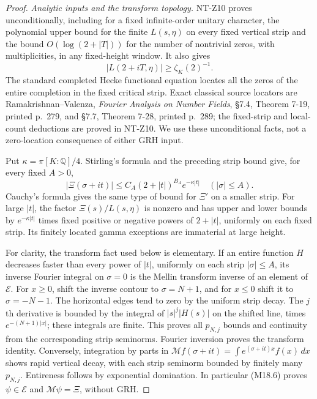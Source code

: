 \begin{proof}
\emph{Analytic inputs and the transform topology.}
NT-Z10 proves unconditionally, including for a fixed
infinite-order unitary character, the polynomial upper bound
for the finite \(L(s,\eta)\) on every fixed vertical strip and
the bound \(O(\log(2+|T|))\) for the number of nontrivial
zeros, with multiplicities, in any fixed-height window.
It also gives
\[
                   |L(2+iT,\eta)|\ge\zeta_K(2)^{-1}.              \tag{M18.5}
\]
The standard completed Hecke functional equation locates all
the zeros of the entire completion in the fixed critical strip.
Exact classical source locators are Ramakrishnan--Valenza,
\emph{Fourier Analysis on Number Fields}, \S7.4,
Theorem 7-19, printed p.~279, and \S7.7, Theorem 7-28,
printed p.~289; the fixed-strip and local-count deductions
are proved in NT-Z10.  We use these unconditional facts,
not a zero-location consequence of either GRH input.

Put \(\kappa=\pi[K:\mathbb Q]/4\).  Stirling's formula and
the preceding strip bound give, for every fixed \(A>0\),
\[
 |\Xi(\sigma+it)|\le C_A(2+|t|)^{B_A}e^{-\kappa|t|}
                         \quad(|\sigma|\le A).                  \tag{M18.6}
\]
Cauchy's formula gives the same type of bound for \(\Xi'\)
on a smaller strip.  For large \(|t|\), the factor
\(\Xi(s)/L(s,\eta)\) is nonzero and has upper and lower
bounds by \(e^{-\kappa|t|}\) times fixed positive or negative
powers of \(2+|t|\), uniformly on each fixed strip.  Its
finitely located gamma exceptions are immaterial at large
height.

For clarity, the transform fact used below is elementary.
If an entire function \(H\) decreases faster than every
power of \(|t|\), uniformly on each strip \(|\sigma|\le A\),
its inverse Fourier integral on \(\sigma=0\) is the Mellin
transform inverse of an element of \(\mathcal E\).
For \(x\ge0\), shift the inverse contour to
\(\sigma=N+1\), and for \(x\le0\) shift it to
\(\sigma=-N-1\).  The horizontal edges tend to zero by the
uniform strip decay.  The \(j\)th derivative is bounded
by the integral of \(|s|^j|H(s)|\) on the shifted line,
times \(e^{-(N+1)|x|}\); these integrals are finite.
This proves all \(p_{N,j}\) bounds and continuity from the
corresponding strip seminorms.  Fourier inversion proves
the transform identity.  Conversely, integration by parts
in \(\mathcal Mf(\sigma+it)=\int e^{(\sigma+it)x}f(x)\,dx\)
shows rapid vertical decay, with each strip seminorm
bounded by finitely many \(p_{N,j}\).  Entireness follows
by exponential domination.  In particular (M18.6) proves
\(\psi\in\mathcal E\) and \(\mathcal M\psi=\Xi\), without GRH.


\end{proof}
